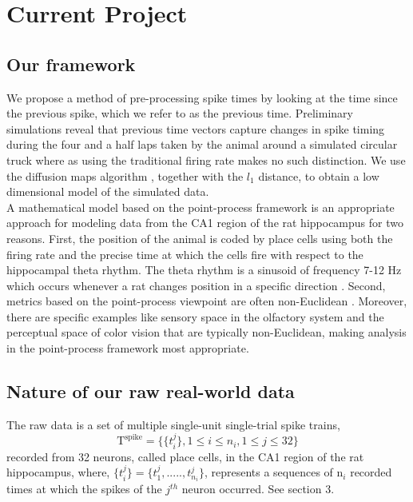 
\section{Current Project}

\subsection{Our framework}

We propose a method of pre-processing spike times by looking at the time since the previous spike, which we refer to as the previous time. 
Preliminary simulations reveal that previous time vectors capture changes in spike timing during the four and a half laps taken by the animal around a simulated circular truck where as using the traditional firing rate makes no such distinction. We use the diffusion maps algorithm \cite{coifman2006diffusion}, together with the $l_{1}$ distance, to obtain a low dimensional model of the simulated data.\\



A mathematical model based on the point-process framework is an appropriate approach for modeling  data from the CA1 region of the rat hippocampus for two reasons. First, the position of the animal is coded by place cells using both the firing rate and the precise time at which the cells fire with respect to the hippocampal theta rhythm.
The theta rhythm is a sinusoid of frequency 7-12 Hz which occurs whenever a rat changes position in  a specific direction \cite{OKeefe1971, Burgess1993}.
Second,  metrics based on the point-process viewpoint are often non-Euclidean \cite{Aronov2004, Victor2005}. Moreover, there are specific examples like sensory space in  the olfactory system and the perceptual space of color vision that are typically non-Euclidean, making analysis in the point-process framework most appropriate.\\


\subsection{Nature of our raw real-world data}
The raw data is a set of multiple single-unit single-trial spike trains,\\
\[ 
\text{T}^{\text{spike}} = \displaystyle \{ \{ t_{i}^{j} \} , 1 \leq i \leq n_{i}, 1 \leq j \leq 32 \}  
\]
recorded from 32 neurons, called  place cells, in the CA1 region of the rat hippocampus, where,
$\displaystyle  \{t_{i}^{j}\} =  \{t_{1}^{j}, ....., t_{n_{i}}^{j} \} $, represents  a sequences of n$_{i}$ recorded times at which the spikes of the $j^{th}$ neuron occurred. See section 3.



